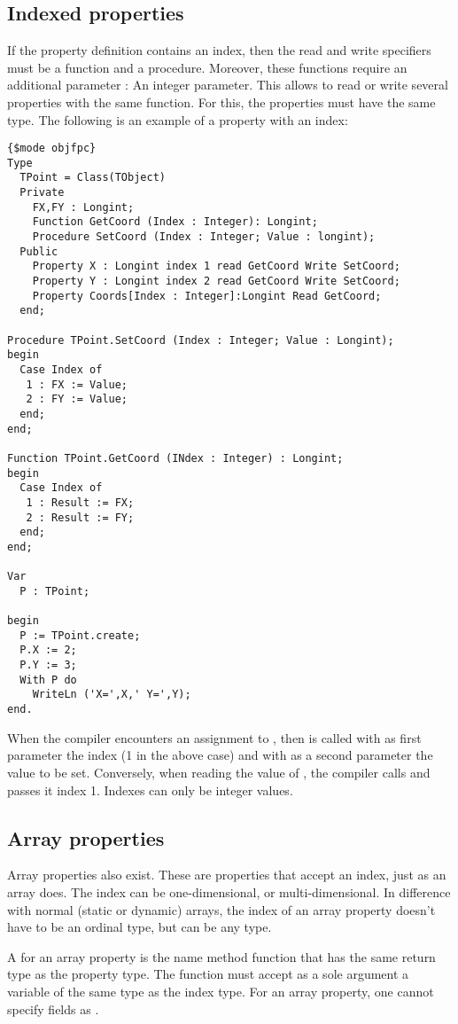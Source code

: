 \subsection{Indexed properties}
If the property definition contains an index,  then the read and write
specifiers must be a function and a procedure. Moreover, these functions
require an additional parameter : An integer parameter. This allows to read
or write several properties with the same function. For this, the properties
must have the same type.
The following is an example of a property with an index:
\begin{verbatim}
{$mode objfpc}
Type
  TPoint = Class(TObject)
  Private
    FX,FY : Longint;
    Function GetCoord (Index : Integer): Longint;
    Procedure SetCoord (Index : Integer; Value : longint);
  Public
    Property X : Longint index 1 read GetCoord Write SetCoord;
    Property Y : Longint index 2 read GetCoord Write SetCoord;
    Property Coords[Index : Integer]:Longint Read GetCoord;
  end;

Procedure TPoint.SetCoord (Index : Integer; Value : Longint);
begin
  Case Index of
   1 : FX := Value;
   2 : FY := Value;
  end;
end;

Function TPoint.GetCoord (INdex : Integer) : Longint;
begin
  Case Index of
   1 : Result := FX;
   2 : Result := FY;
  end;
end;

Var
  P : TPoint;

begin
  P := TPoint.create;
  P.X := 2;
  P.Y := 3;
  With P do
    WriteLn ('X=',X,' Y=',Y);
end.
\end{verbatim}
When the compiler encounters an assignment to , then 
is called with as first parameter the index (1 in the above case) and with
as a second parameter the value to be set.
Conversely, when reading the value of , the compiler calls
 and passes it index 1.
Indexes can only be integer values.

\subsection{Array properties}
Array properties also exist. These are properties that accept an
index, just as an array does. The index can be one-dimensional, or multi-dimensional.
In difference with normal (static or dynamic) arrays, the index of an array property
doesn't have to be an ordinal type, but can be any type.

A  for an array property is the name method function
that has the same return type as the property type.
The function must accept as a sole argument a variable of the same type as
the index type. For an array property, one cannot specify fields as .

